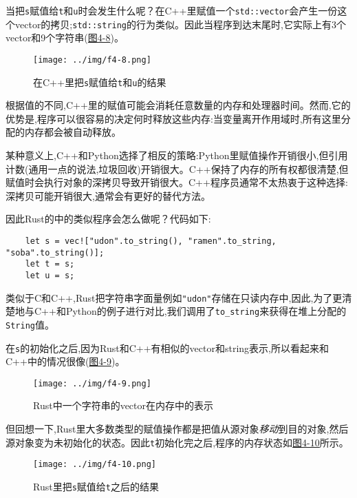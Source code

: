 当把\texttt{s}赋值给\texttt{t}和\texttt{u}时会发生什么呢？在C++里赋值一个\texttt{std::vector}会产生一份这个vector的拷贝;\texttt{std::string}的行为类似。因此当程序到达末尾时,它实际上有3个vector和9个字符串(\hyperref[f4-8]{图4-8})。

\begin{figure}[htbp]
    \centering
    \texttt{[image: ../img/f4-8.png]}
    \caption{在C++里把\texttt{s}赋值给\texttt{t}和\texttt{u}的结果}
    \label{f4-8}
\end{figure}

根据值的不同,C++里的赋值可能会消耗任意数量的内存和处理器时间。然而,它的优势是,程序可以很容易的决定何时释放这些内存:当变量离开作用域时,所有这里分配的内存都会被自动释放。

某种意义上,C++和Python选择了相反的策略:Python里赋值操作开销很小,但引用计数(通用一点的说法,垃圾回收)开销很大。C++保持了内存的所有权都很清楚,但赋值时会执行对象的深拷贝导致开销很大。C++程序员通常不太热衷于这种选择:深拷贝可能开销很大,通常会有更好的替代方法。

因此Rust的中的类似程序会怎么做呢？代码如下:
\begin{verbatim}
    let s = vec!["udon".to_string(), "ramen".to_string, "soba".to_string()];
    let t = s;
    let u = s;
\end{verbatim}

类似于C和C++,Rust把字符串字面量例如\texttt{"udon"}存储在只读内存中,因此,为了更清楚地与C++和Python的例子进行对比,我们调用了\texttt{to\_string}来获得在堆上分配的\texttt{String}值。

在\texttt{s}的初始化之后,因为Rust和C++有相似的vector和string表示,所以看起来和C++中的情况很像(\hyperref[f4-9]{图4-9})。

\begin{figure}[htbp]
    \centering
    \texttt{[image: ../img/f4-9.png]}
    \caption{Rust中一个字符串的vector在内存中的表示}
    \label{f4-9}
\end{figure}

但回想一下,Rust里大多数类型的赋值操作都是把值从源对象\emph{移动}到目的对象,然后源对象变为未初始化的状态。因此\texttt{t}初始化完之后,程序的内存状态如\hyperref[f4-10]{图4-10}所示。

\begin{figure}[htbp]
    \centering
    \texttt{[image: ../img/f4-10.png]}
    \caption{Rust里把\texttt{s}赋值给\texttt{t}之后的结果}
    \label{f4-10}
\end{figure}

